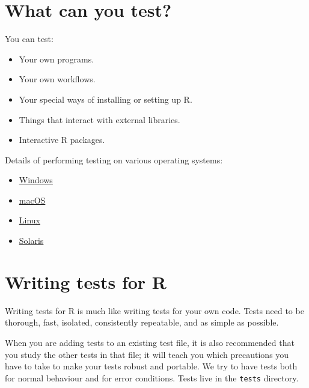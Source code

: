 \documentclass[
]{book}
\begin{document}
\hypertarget{what-can-you-test}{%
\section{What can you test?}\label{what-can-you-test}}

You can test:

\begin{itemize}
\item
  Your own programs.
\item
  Your own workflows.
\item
  Your special ways of installing or setting up R.
\item
  Things that interact with external libraries.
\item
  Interactive R packages.
\end{itemize}

Details of performing testing on various operating systems:

\begin{itemize}
\item
  \href{https://blog.r-project.org/2021/04/28/r-can-use-your-help-testing-r-before-release/index.html\#on-windows}{Windows}
\item
  \href{https://blog.r-project.org/2021/04/28/r-can-use-your-help-testing-r-before-release/index.html\#on-macos}{macOS}
\item
  \href{https://blog.r-project.org/2021/04/28/r-can-use-your-help-testing-r-before-release/index.html\#on-linux}{Linux}
\item
  \href{https://blog.r-project.org/2021/04/28/r-can-use-your-help-testing-r-before-release/index.html\#on-solaris}{Solaris}
\end{itemize}

\hypertarget{writing-tests-for-r}{%
\section{Writing tests for R}\label{writing-tests-for-r}}

Writing tests for R is much like writing tests for your own code. Tests need to be thorough, fast, isolated, consistently repeatable, and as simple as possible.

When you are adding tests to an existing test file, it is also recommended that you study the other tests in that file; it will teach you which precautions you have to take to make your tests robust and portable. We try to have tests both for normal behaviour and for error conditions. Tests live in the \texttt{tests} directory.
\end{document}
